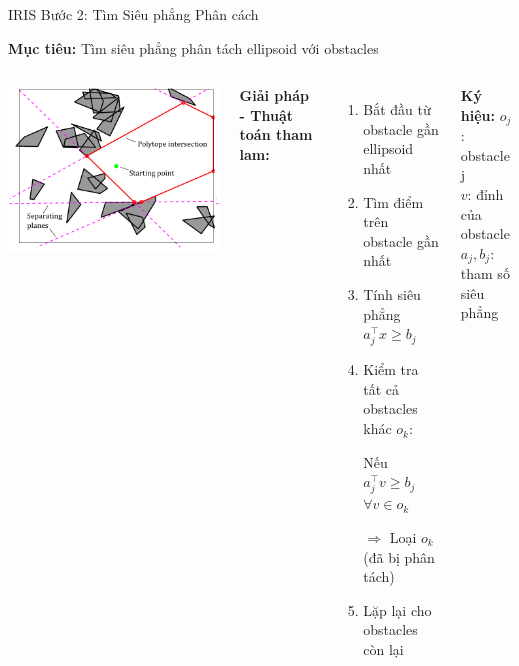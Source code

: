 \documentclass[aspectratio=169]{beamer}
\begin{document}
\begin{frame}{IRIS Bước 2: Tìm Siêu phẳng Phân cách}
    
    \textbf{Mục tiêu:} Tìm siêu phẳng phân tách ellipsoid với obstacles
    
    \begin{columns}[c]
        \includegraphics[width=\textwidth]{../imgs/iris_algo_1.png}
        
        \vspace{0.5em}
        \textbf{Giải pháp - Thuật toán tham lam:}
        \begin{enumerate}
            \item Bắt đầu từ obstacle gần ellipsoid nhất
            \item Tìm điểm trên obstacle gần nhất
            \item Tính siêu phẳng $a_j^\top x \geq b_j$
            \item Kiểm tra tất cả obstacles khác $o_k$:
            
            Nếu $a_j^\top v \geq b_j$ $\forall v \in o_k$
            
            $\Rightarrow$ Loại $o_k$ (đã bị phân tách)
            \item Lặp lại cho obstacles còn lại
        \end{enumerate}

        \vspace{0.3em}
        {\small
        \textbf{Ký hiệu:}
        $o_j$: obstacle j \\
        $v$: đỉnh của obstacle\\
        $a_j, b_j$: tham số siêu phẳng
        }
    \end{columns}

\end{frame}
\end{document}
